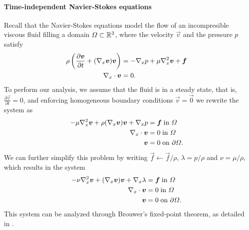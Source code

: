 \paragraph{Time-independent Navier-Stokes equations} Recall that the Navier-Stokes equations model the flow of an incompresible viscous fluid filling a domain $\Omega\subset\mathbb{R}^3$, where the velocity $\vec v$ and the pressure $p$ satisfy
\begin{align*}
    \rho\left(\frac{\partial \vec v}{\partial t} + (\vx\vec v)\vec v\right) &= -\vx p + \mu\vx^2 \vec v + \vec f\\
    \vx\cdot\vec v &= 0.
\end{align*} 
To perform our analysis, we assume that the fluid is in a steady state, that is, $\frac{\partial \vec v}{\partial t} = 0$, and enforcing homogeneous boundary conditions $\vec v = \vec 0$ we rewrite the system as 
\begin{align*}
    -\mu\vx^2\vec v + \rho (\vx\vec v)\vec v + \vx p &= \vec f\;\tin \Omega\\
    \vx\cdot\vec v &= 0 \;\tin \Omega\\
    \vec v &= 0 \;\ton \partial\Omega.
\end{align*} 
We can further simplify this problem by writing $\vec f\leftarrow \vec f / \rho$, $\lambda = p/\rho$ and $\nu = \mu/\rho$, which results in the system
\begin{align*}
    -\nu \vx^2\vec v + (\vx\vec v)\vec v + \vx \lambda &= \vec f\;\tin \Omega\\
    \vx\cdot\vec v &= 0 \;\tin \Omega\\
    \vec v &= 0 \;\ton \partial\Omega.  
\end{align*}
This system can be analyzed through Brouwer's fixed-point theorem, as detailed in \cite{ciarlet2013linear}.
